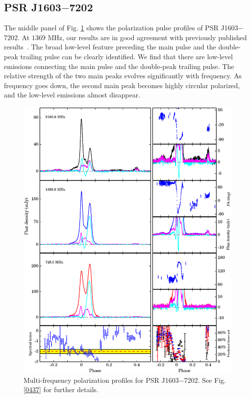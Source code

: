 \documentclass[useAMS,usenatbib]{mn2e}
\begin{document}
\subsection{PSR J1603$-$7202}

The middle panel of Fig. \ref{1603} shows the polarization pulse profiles of 
PSR J1603$-$7202.
%
At $1369$ MHz, our results are in good agreement with previously published
results~\citep{Ord04,Yan11}.
%
The broad low-level feature preceding the main pulse and the double-peak trailing 
pulse can be clearly identified.
%
We find that there are low-level emissions connecting the main pulse and the 
double-peak trailing pulse.
%
The relative strength of the two main peaks evolves significantly with frequency.
%
As frequency goes down, the second main peak becomes highly circular polarized, 
and the low-level emissions almost disappear.

\begin{figure}
\begin{center}
\includegraphics[width=6 in]{1603.ps}
\caption{Multi-frequency polarization profiles for PSR J1603$-$7202. 
See Fig. \ref{0437} for further details.}
\label{1603}
\end{center}
\end{figure}
\end{document}

